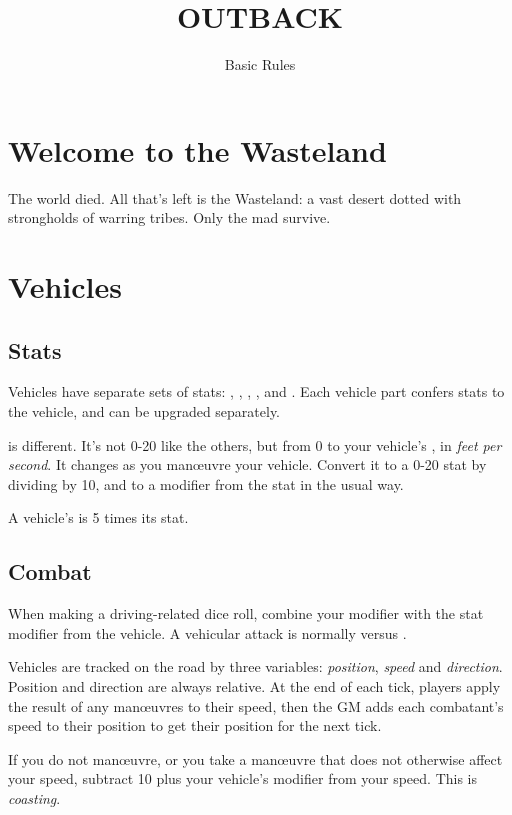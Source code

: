 \documentclass[10pt, a4paper, twocolumn]{article}
\title{\uppercase{Outback}}
\date{}
\begin{document}
\subtitle{Basic Rules}
\compacttitle

\section{Welcome to the Wasteland}
The world died. All that's left is the Wasteland: a vast desert dotted with strongholds of warring tribes. Only the mad survive.








\section{Vehicles}
\subsection{Stats}
Vehicles have separate sets of stats: , , , ,  and . Each vehicle part confers stats to the vehicle, and can be upgraded separately.

 is different. It's not 0-20 like the others, but from 0 to your vehicle's , in \emph{feet per second}. It changes as you man\oe{}uvre your vehicle. Convert it to a 0-20 stat by dividing by 10, and to a modifier from the stat in the usual way.

A vehicle's  is 5 times its  stat.

\subsection{Combat}
When making a driving-related dice roll, combine your  modifier with the stat modifier from the vehicle. A vehicular attack is normally  versus .

Vehicles are tracked on the road by three variables: \emph{position}, \emph{speed} and \emph{direction}. Position and direction are always relative. At the end of each tick, players apply the result of any man\oe{}uvres to their speed, then the GM adds each combatant's speed to their position to get their position for the next tick.

If you do not man\oe{}uvre, or you take a man\oe{}uvre that does not otherwise affect your speed, subtract 10 plus your vehicle's  modifier from your speed. This is \emph{coasting}.
\end{document}
